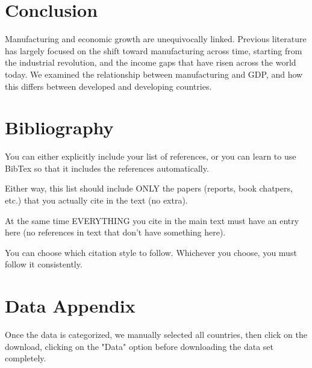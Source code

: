 \documentclass[12pt]{article}
\begin{document}
\section{Conclusion}
\label{sec:conclusion}

Manufacturing and economic growth are unequivocally linked. Previous literature has largely focused on the shift toward manufacturing across time, starting from the industrial revolution, and the income gaps that have risen across the world today.  We examined the relationship between manufacturing and GDP, and how this differs between developed and developing countries.

\newpage
\section*{Bibliography}
\singlespacing
\setlength\bibsep{0pt}

You can either explicitly include your list of references, or you can learn to use BibTex so that it includes the references automatically.

Either way, this list should include ONLY the papers (reports, book chatpers, etc.) that you actually cite in the text (no extra).

At the same time EVERYTHING you cite in the main text must have an entry here (no references in text that don't have something here).

You can choose which citation style to follow. Whichever you choose, you must follow it consistently.

\newpage
\section*{Data Appendix} \label{sec:appendixa}

Once the data is categorized, we manually selected all countries, then click on the download, clicking on the "Data" option before downloading the data set completely. 
\end{document}
